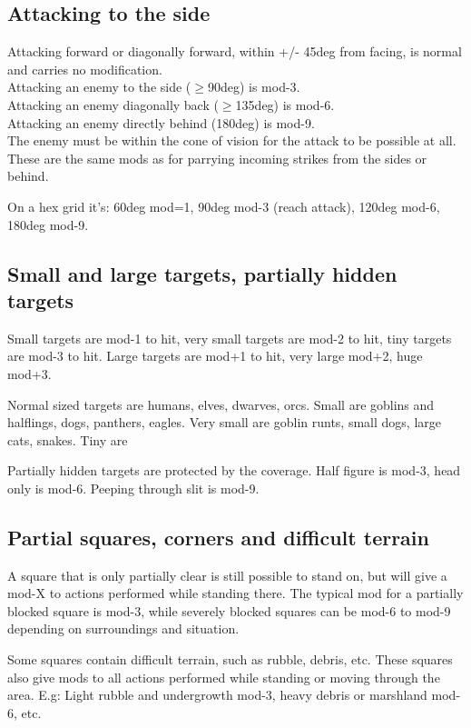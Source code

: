 \subsection*{Attacking to the side}
Attacking forward or diagonally forward, within +/- 45deg from facing, is normal and carries no modification. \\
Attacking an enemy to the side ($\ge$90deg) is mod-3. \\
Attacking an enemy diagonally back ($\ge$135deg) is mod-6. \\
Attacking an enemy directly behind (180deg) is mod-9. \\
The enemy must be within the cone of vision for the attack to be possible at all. \\
These are the same mods as for parrying incoming strikes from the sides or behind.

On a hex grid it's: 60deg mod=1, 90deg mod-3 (reach attack), 120deg mod-6, 180deg mod-9.


\subsection*{Small and large targets, partially hidden targets}
Small targets are mod-1 to hit, very small targets are mod-2 to hit, tiny targets are mod-3 to hit. Large targets are mod+1 to hit, very large mod+2, huge mod+3.

Normal sized targets are humans, elves, dwarves, orcs. Small are goblins and halflings, dogs, panthers, eagles. Very small are goblin runts, small dogs, large cats, snakes. Tiny are

Partially hidden targets are protected by the coverage. Half figure is mod-3, head only is mod-6. Peeping through slit is mod-9.


\subsection*{Partial squares, corners and difficult terrain}
A square that is only partially clear is still possible to stand on, but will give a mod-X to actions performed while standing there. The typical mod for a partially blocked square is mod-3, while severely blocked squares can be mod-6 to mod-9 depending on surroundings and situation.

Some squares contain difficult terrain, such as rubble, debris, etc. These squares also give mods to all actions performed while standing or moving through the area. E.g: Light rubble and undergrowth mod-3, heavy debris or marshland mod-6, etc.

